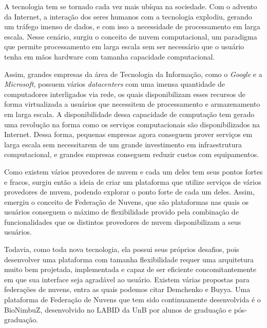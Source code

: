 A tecnologia tem se tornado cada vez mais ubíqua na sociedade. Com o advento da Internet, a interação dos seres humanos com a tecnologia explodiu, gerando um tráfego imenso de dados, e com isso a necessidade de processamento em larga escala. Nesse cenário, surgiu o conceito de nuvem computacional, um paradigma que permite processamento em larga escala sem ser necessário que o usuário tenha em mãos hardware com tamanha capacidade computacional.

Assim, grandes empresas da área de Tecnologia da Informação, como o \textit{Google}\cite{Google} e a \textit{Microsoft}\cite{Microsoft}, possuem vários \textit{datacenters} com uma imensa quantidade de computadores interligados via rede, os quais disponibilizam esses recursos de forma virtualizada a usuários que necessitem de processamento e armazenamento em larga escala. A disponibilidade dessa capacidade de computação tem gerado uma revolução na forma como os serviços computacionais são disponibilizados na Internet.
Dessa forma, pequenas empresas agora conseguem prover serviços em larga escala sem necessitarem de um grande investimento em infraestrutura computacional, e grandes empresas conseguem reduzir custos com equipamentos.

Como existem vários provedores de nuvem e cada um deles tem seus pontos fortes e fracos, surgiu então a ideia de criar um plataforma que utilize serviços de vários provedores de nuvem, podendo explorar o ponto forte de cada um deles. Assim, emergiu o conceito de Federação de Nuvens\cite{6427607}, que são plataformas nas quais os usuários conseguem o máximo de flexibilidade provido pela combinação de funcionalidades que os distintos provedores de nuvem disponibilizam a seus usuários.

Todavia, como toda nova tecnologia, ela possui seus próprios desafios, pois desenvolver uma plataforma com tamanha flexibilidade requer uma arquitetura muito bem projetada, implementada e capaz de ser eficiente concomitantemente em que sua interface seja agradável ao usuário. Existem várias propostas para federações de nuvens, entra as quais podemos citar Demchenko\cite{6427607} e Buyya\cite{Buyya:2010:IUF:2143583.2143586}. Uma plataforma de Federação de Nuvens que tem sido continuamente desenvolvida é o BioNimbuZ, desenvolvido no \acrfull{LABID} da \acrfull{UnB}\cite{BioNimbuZ_Breno_Deric} \cite{BioNimbuZ_Closer} \cite{BioNimbuZ_6846526} \cite{Saldanha2012} \cite{6732620_BioNimbuZ_ACOsched} \cite{BioNimbuZ_Willian_C99} \cite{closer12_BioNimbuZ_AHP} \cite{Saldanha_BioNimbus} por alunos de graduação e pós-graduação.

